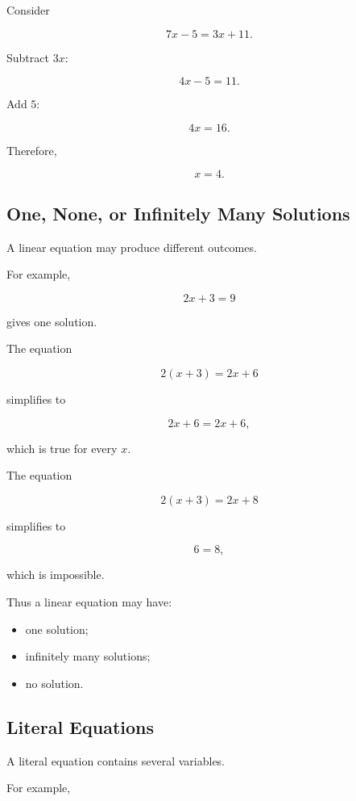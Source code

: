Consider

\[ 7x-5=3x+11. \]

Subtract \(3x\):

\[ 4x-5=11. \]

Add \(5\):

\[ 4x=16. \]

Therefore,

\[ x=4. \]

\subsection{One, None, or Infinitely Many Solutions}
\label{subsec:linear-solution-cases}

A linear equation may produce different outcomes.

For example,

\[ 2x+3=9 \]

gives one solution.

The equation

\[ 2(x+3)=2x+6 \]

simplifies to

\[ 2x+6=2x+6, \]

which is true for every \(x\).

The equation

\[ 2(x+3)=2x+8 \]

simplifies to

\[ 6=8, \]

which is impossible.

Thus a linear equation may have:

\begin{itemize}
    \item one solution;
    \item infinitely many solutions;
    \item no solution.
\end{itemize}

\subsection{Literal Equations}
\label{subsec:literal-equations}

A literal equation contains several variables.

For example,

